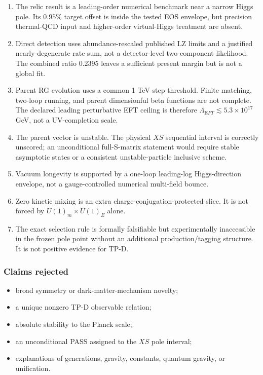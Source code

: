 \documentclass[
]{article}
\providecommand{\tightlist}{%
  \setlength{\itemsep}{0pt}\setlength{\parskip}{0pt}}
\begin{document}
\begin{enumerate}
\def\labelenumi{\arabic{enumi}.}
\tightlist
\item
  The relic result is a leading-order numerical benchmark near a narrow
  Higgs pole. Its \(0.95\%\) target offset is inside the tested EOS
  envelope, but precision thermal-QCD input and higher-order
  virtual-Higgs treatment are absent.
\item
  Direct detection uses abundance-rescaled published LZ limits and a
  justified nearly-degenerate rate sum, not a detector-level
  two-component likelihood. The combined ratio \(0.2395\) leaves a
  sufficient present margin but is not a global fit.
\item
  Parent RG evolution uses a common 1 TeV step threshold. Finite
  matching, two-loop running, and parent dimensionful beta functions are
  not complete. The declared leading perturbative EFT ceiling is
  therefore \(\Lambda_{\mathrm EFT}\lesssim5.3\times10^{17}\) GeV, not a
  UV-completion scale.
\item
  The parent vector is unstable. The physical \(XS\) sequential interval
  is correctly unscored; an unconditional full-S-matrix statement would
  require stable asymptotic states or a consistent unstable-particle
  inclusive scheme.
\item
  Vacuum longevity is supported by a one-loop leading-log
  Higgs-direction envelope, not a gauge-controlled numerical multi-field
  bounce.
\item
  Zero kinetic mixing is an extra charge-conjugation-protected slice. It
  is not forced by \(U(1)_m\times U(1)_E\) alone.
\item
  The exact selection rule is formally falsifiable but experimentally
  inaccessible in the frozen pole point without an additional
  production/tagging structure. It is not positive evidence for TP-D.
\end{enumerate}

\hypertarget{claims-rejected}{%
\subsubsection{Claims rejected}\label{claims-rejected}}

\begin{itemize}
\tightlist
\item
  broad symmetry or dark-matter-mechanism novelty;
\item
  a unique nonzero TP-D observable relation;
\item
  absolute stability to the Planck scale;
\item
  an unconditional PASS assigned to the \(XS\) pole interval;
\item
  explanations of generations, gravity, constants, quantum gravity, or
  unification.
\end{itemize}
\end{document}

